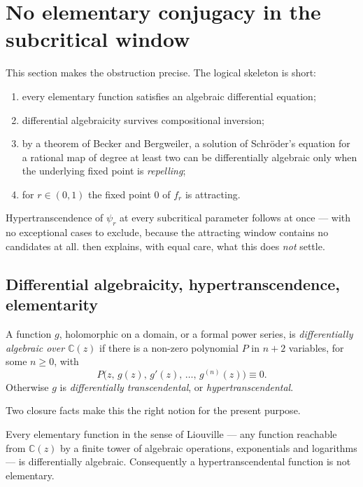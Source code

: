 \section{No elementary conjugacy in the subcritical window}
\label{a:sec:ht}

This section makes the obstruction precise. The logical skeleton is short:
\begin{enumerate}[label=(\roman*),leftmargin=*]
\item every elementary function satisfies an algebraic differential equation;
\item differential algebraicity survives compositional inversion;
\item by a theorem of Becker and Bergweiler, a solution of Schröder's equation for
      a rational map of degree at least two can be differentially algebraic only
      when the underlying fixed point is \emph{repelling};
\item for $r\in(0,1)$ the fixed point $0$ of $f_r$ is attracting.
\end{enumerate}
Hypertranscendence of $\psi_r$ at every subcritical parameter follows at once ---
with no exceptional cases to exclude, because the attracting window contains no
candidates at all.  then explains, with equal care, what this
does \emph{not} settle.

\subsection{Differential algebraicity, hypertranscendence, elementarity}
\label{a:sec:dadefs}

\begin{definition}
\label{a:def:da}
A function $g$, holomorphic on a domain, or a formal power series, is
\emph{differentially algebraic over $\mathbb C(z)$} if there is a non-zero
polynomial $P$ in $n+2$ variables, for some $n\ge0$, with
\begin{equation}
\label{a:eq:dadef}
P\bigl(z,\,g(z),\,g'(z),\,\dots,\,g^{(n)}(z)\bigr)\equiv0 .
\end{equation}
Otherwise $g$ is \emph{differentially transcendental}, or
\emph{hypertranscendental}.
\end{definition}

Two closure facts make this the right notion for the present purpose.

\begin{lemma}
\label{a:lem:elemda}
Every elementary function in the sense of Liouville --- any function reachable from
$\mathbb C(z)$ by a finite tower of algebraic operations, exponentials and
logarithms --- is differentially algebraic. Consequently a hypertranscendental
function is not elementary.
\end{lemma}

